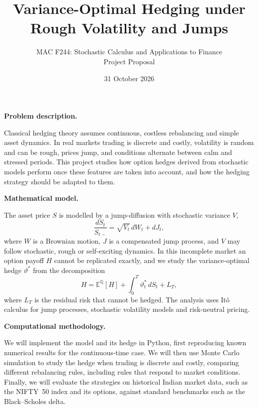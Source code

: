 \documentclass[10pt,leqno]{amsart}
\begin{document}
\title{Variance-Optimal Hedging under Rough Volatility and Jumps}
\author{MAC F244: Stochastic Calculus and Applications to Finance \\ Project Proposal}
\date{31 October 2026}
\maketitle
\vspace{-1.5em}

\let\thefootnote\relax
{}

\bigskip

\noindent\textbf{Problem description.}\par
\noindent Classical hedging theory assumes continuous, costless rebalancing and simple asset dynamics. In real markets trading is discrete and costly, volatility is random and can be rough, prices jump, and conditions alternate between calm and stressed periods. This project studies how option hedges derived from stochastic models perform once these features are taken into account, and how the hedging strategy should be adapted to them.

\medskip

\noindent\textbf{Mathematical model.}\par
\noindent The asset price $S$ is modelled by a jump-diffusion with stochastic variance $V$,
\[
\frac{dS_t}{S_{t-}} = \sqrt{V_t}\,dW_t + dJ_t ,
\]
where $W$ is a Brownian motion, $J$ is a compensated jump process, and $V$ may follow stochastic, rough or self-exciting dynamics. In this incomplete market an option payoff $H$ cannot be replicated exactly, and we study the variance-optimal hedge $\vartheta^*$ from the decomposition
\[
H = \mathbb{E}^{\mathbb{Q}}[H] + \int_0^T \vartheta^*_t \, dS_t + L_T ,
\]
where $L_T$ is the residual risk that cannot be hedged. The analysis uses It\^o calculus for jump processes, stochastic volatility models and risk-neutral pricing.

\medskip

\noindent\textbf{Computational methodology.}\par
\noindent We will implement the model and its hedge in Python, first reproducing known numerical results for the continuous-time case. We will then use Monte Carlo simulation to study the hedge when trading is discrete and costly, comparing different rebalancing rules, including rules that respond to market conditions. Finally, we will evaluate the strategies on historical Indian market data, such as the NIFTY~50 index and its options, against standard benchmarks such as the Black--Scholes delta.
\end{document}
